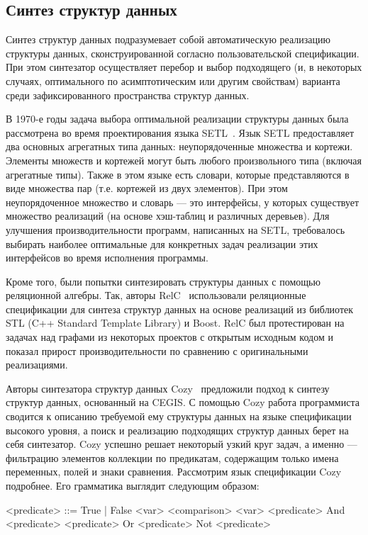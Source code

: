 \documentclass[14pt]{matmex-diploma-custom}
\begin{document}
\subsection{Синтез структур данных}
Синтез структур данных подразумевает собой автоматическую реализацию структуры данных, сконструированной согласно пользовательской спецификации. При этом синтезатор осуществляет перебор и выбор подходящего (и, в некоторых случаях, оптимального по асимптотическим или другим свойствам) варианта среди зафиксированного пространства структур данных.

В 1970-е годы задача выбора оптимальной реализации структуры данных была рассмотрена во время проектирования языка SETL~\cite{setl}. Язык SETL предоставляет два основных агрегатных типа данных: неупорядоченные множества и кортежи. Элементы множеств и кортежей могут быть любого произвольного типа (включая агрегатные типы). Также в этом языке есть словари, которые представляются в виде множества пар (т.е. кортежей из двух элементов). При этом неупорядоченное множество и словарь --- это интерфейсы, у которых существует множество реализаций (на основе хэш-таблиц и различных деревьев). Для улучшения производительности программ, написанных на SETL, требовалось выбирать наиболее оптимальные для конкретных задач реализации этих интерфейсов во время исполнения программы.

Кроме того, были попытки синтезировать структуры данных с помощью реляционной алгебры. Так, авторы RelC~\cite{RelC} использовали реляционные спецификации для синтеза структур данных на основе реализаций из библиотек STL (C++ Standard Template Library) и Boost. RelC был протестирован на задачах над графами из некоторых проектов с открытым исходным кодом и показал прирост производительности по сравнению с оригинальными реализациями.

Авторы синтезатора структур данных Cozy~\cite{Cozy} предложили подход к синтезу структур данных, основанный на CEGIS. С помощью Cozy работа программиста сводится к описанию требуемой ему структуры данных на языке спецификации высокого уровня, а поиск и реализацию подходящих структур данных берет на себя синтезатор. Cozy успешно решает некоторый узкий круг задач, а именно --- фильтрацию элементов коллекции по предикатам, содержащим только имена переменных, полей и знаки сравнения.
Рассмотрим язык спецификации Cozy подробнее. Его грамматика выглядит следующим образом:

\begin{grammar}
<predicate> ::= True | False 
\alt <var> <comparison> <var> 
\alt <predicate> And <predicate> \alt <predicate> Or <predicate>
\alt Not <predicate>
\end{grammar}
\end{document}
